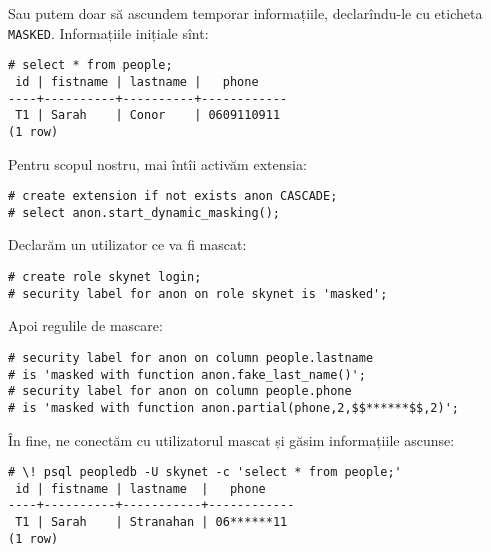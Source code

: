 Sau putem doar să ascundem temporar informațiile, declarîndu-le cu
eticheta \texttt{MASKED}. Informațiile inițiale sînt:
{
  \small
\begin{verbatim}
# select * from people;
 id | fistname | lastname |   phone    
----+----------+----------+------------
 T1 | Sarah    | Conor    | 0609110911
(1 row)
\end{verbatim}
}

Pentru scopul nostru, mai întîi activăm extensia:
{
  \small
\begin{verbatim}
# create extension if not exists anon CASCADE;
# select anon.start_dynamic_masking();
\end{verbatim}
}

Declarăm un utilizator ce va fi mascat:
{
  \small
\begin{verbatim}
# create role skynet login;
# security label for anon on role skynet is 'masked';
\end{verbatim}
}

Apoi regulile de mascare:
{
  \small
\begin{verbatim}
# security label for anon on column people.lastname 
# is 'masked with function anon.fake_last_name()';
# security label for anon on column people.phone 
# is 'masked with function anon.partial(phone,2,$$******$$,2)';
\end{verbatim}
}

În fine, ne conectăm cu utilizatorul mascat și găsim informațiile ascunse:
{
  \small
\begin{verbatim}
# \! psql peopledb -U skynet -c 'select * from people;'
 id | fistname | lastname  |   phone    
----+----------+-----------+------------
 T1 | Sarah    | Stranahan | 06******11
(1 row)
\end{verbatim}
}


